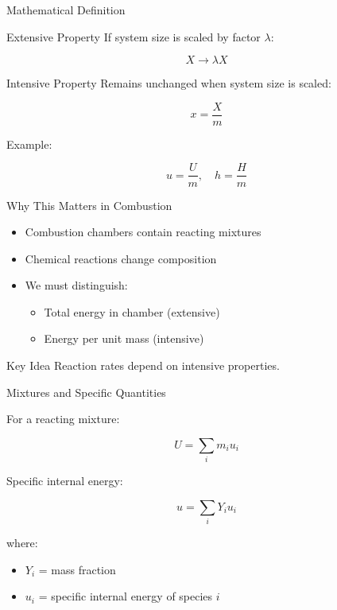 \documentclass[aspectratio=169]{beamer}
\begin{document}
\begin{frame}{Mathematical Definition}

\begin{block}{Extensive Property}
If system size is scaled by factor $\lambda$:

\[
X \rightarrow \lambda X
\]

\end{block}


\begin{block}{Intensive Property}
Remains unchanged when system size is scaled:

\[
x = \frac{X}{m}
\]

\end{block}

\vspace{0.3cm}

Example:

\[
u = \frac{U}{m}, \quad h = \frac{H}{m}
\]

\end{frame}

\begin{frame}{Why This Matters in Combustion}

\begin{itemize}
  \item Combustion chambers contain reacting mixtures
  \item Chemical reactions change composition
  \item We must distinguish:
  \begin{itemize}
    \item Total energy in chamber (extensive)
    \item Energy per unit mass (intensive)
  \end{itemize}
\end{itemize}

\vspace{0.3cm}

\begin{block}{Key Idea}
Reaction rates depend on intensive properties.
\end{block}

\end{frame}

\begin{frame}{Mixtures and Specific Quantities}

For a reacting mixture:

\[
U = \sum_i m_i u_i
\]

Specific internal energy:

\[
u = \sum_i Y_i u_i
\]

where:
\begin{itemize}
  \item $Y_i$ = mass fraction
  \item $u_i$ = specific internal energy of species $i$
\end{itemize}

\end{frame}
\end{document}
